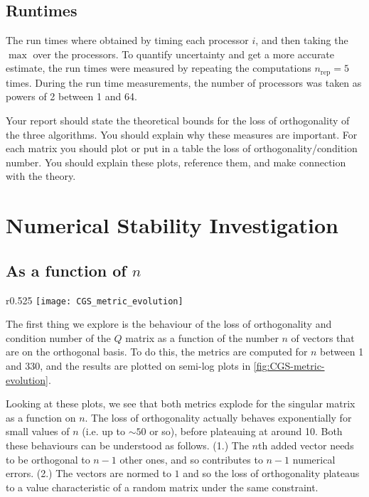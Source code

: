 \documentclass[a4paper, 12pt,oneside]{article}
\begin{document}
		\subsection{Runtimes}
			The run times where obtained by timing each processor $i$, and then taking the $\max{}$ over the processors. To quantify uncertainty and get a more accurate estimate, the run times were measured by repeating the computations $n_{\text{rep}}=5$ times.
			During the run time measurements, the number of processors was taken as powers of 2 between 1 and 64.
				
		Your report should state the theoretical bounds for the loss of orthogonality of the three algorithms. You should explain why these measures are important. For each matrix you should plot or put in a table the loss of orthogonality/condition number. You should explain these plots, reference them, and make connection with the theory.
	\section{Numerical Stability Investigation}
		\subsection{As a function of $n$}
		\begin{wrapfigure}[32]{r}{0.525\textwidth}
			\vspace{-1em}
			\centering
			\texttt{[image: CGS\_metric\_evolution]}
			\caption{Pseudocode of parallelised TSQR algorithm.}
			\label{fig:CGS-metric-evolution}
		\end{wrapfigure}
		The first thing we explore is the behaviour of the loss of orthogonality and condition number of the $Q$ matrix as a function of the number $n$ of vectors that are on the orthogonal basis. To do this, the metrics are computed for $n$ between 1 and 330, and the results are plotted on semi-log plots in \ref{fig:CGS-metric-evolution}.

		Looking at these plots, we see that both metrics explode for the singular matrix as a function on $n$. The loss of orthogonality actually behaves exponentially for small values of $n$ (i.e. up to $\sim 50$ or so), before plateauing at around 10. Both these behaviours can be understood as follows. (1.) The $n$th added vector needs to be orthogonal to $n-1$ other ones, and so contributes to $n-1$ numerical errors. (2.) The vectors are normed to $1$ and so the loss of orthogonality plateaus to a value characteristic of a random matrix under the same constraint. 
\end{document}

